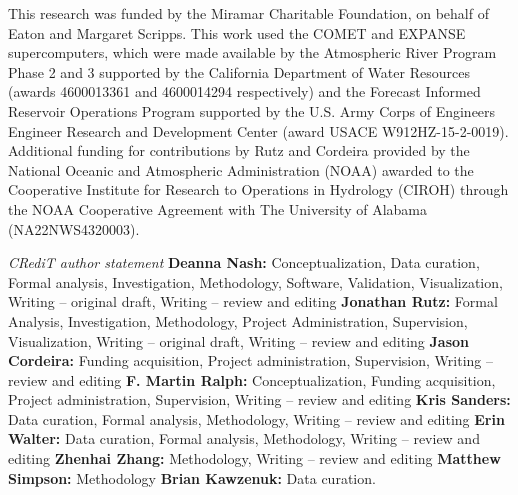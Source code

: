 \documentclass[draft]{agujournal2019}
\begin{document}


\acknowledgments
This research was funded by the Miramar Charitable Foundation, on behalf of Eaton and Margaret Scripps. This work used the COMET and EXPANSE supercomputers, which were made available by the Atmospheric River Program Phase 2 and 3 supported by the California Department of Water Resources (awards 4600013361 and 4600014294 respectively) and the Forecast Informed Reservoir Operations Program supported by the U.S. Army Corps of Engineers Engineer Research and Development Center (award USACE W912HZ-15-2-0019). Additional funding for contributions by Rutz and Cordeira provided by the National Oceanic and Atmospheric Administration (NOAA) awarded to the Cooperative Institute for Research to Operations in Hydrology (CIROH) through the NOAA Cooperative Agreement with The University of Alabama (NA22NWS4320003). 



\textit{CRediT author statement} \textbf{Deanna Nash:} Conceptualization, Data curation, Formal analysis, Investigation, Methodology, Software, Validation, Visualization, Writing – original draft, Writing – review and editing \textbf{Jonathan Rutz:} Formal Analysis, Investigation, Methodology, Project Administration, Supervision, Visualization, Writing – original draft, Writing – review and editing \textbf{Jason Cordeira:} Funding acquisition, Project administration, Supervision, Writing – review and editing \textbf{F. Martin Ralph:} Conceptualization, Funding acquisition, Project administration, Supervision, Writing – review and editing \textbf{Kris Sanders:} Data curation, Formal analysis, Methodology, Writing – review and editing \textbf{Erin Walter:} Data curation, Formal analysis, Methodology, Writing – review and editing \textbf{Zhenhai Zhang:} Methodology, Writing – review and editing \textbf{Matthew Simpson:} Methodology \textbf{Brian Kawzenuk:} Data curation.
\end{document}
